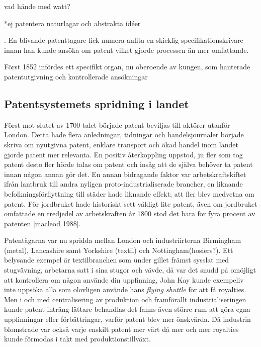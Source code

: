 vad hände med watt?

*ej patentera naturlagar och abstrakta idéer 


. En
blivande patenttagare fick numera anlita en skicklig specifikationskrivare innan han kunde ansöka om
patent vilket gjorde processen än mer omfattande.

Först 1852 infördes ett specifikt organ, nu oberoende av kungen, som hanterade patentutgivning och kontrollerade ansökningar


\subsection{Patentsystemets spridning i landet} %
\label{sub:patentsystemets_spridning_i_landet}

Först mot slutet av 1700-talet började patent beviljas till aktörer utanför London. Detta hade flera
anledningar, tidningar och handelsjournaler började skriva om nyutgivna patent, enklare transport och
ökad handel inom landet gjorde patent mer relevanta. En positiv återkoppling uppstod, ju fler som tog
patent desto fler hörde talas om patent och insåg att de själva behöver ta patent innan någon annan gör
det. En annan bidragande faktor var arbetskraftskiftet ifrån lantbruk till andra nyligen
proto-industrialiserade brancher, en liknande befolkningsförflyttning till städer hade liknande effekt;
att fler blev medvetna om patent. För jordbruket hade historiskt sett väldigt lite patent, även om
jordbruket omfattade en tredjedel av arbetskraften år 1800 stod det bara för fyra procent av patenten
[macleod 1988].

Patentägarna var nu spridda mellan London och industriirterna Birmingham (metal), Lancashire samt
Yorkshire (textil) och Nottingham(hosiers?). Ett belysande exempel är textilbranchen som under gillet
främst sysslat med stugvävning, arbetarna satt i sina stugor och vävde, då var det snudd på omöjligt att
kontrollera om någon använde din uppfinning, John Kay kunde exempeliv inte uppsöka alla som olovligen
använde hans \emph{flying shuttle} för att få royalties. Men i och med centralisering av produktion och
framförallt industrialiseringen kunde patent intrång lättare behandlas det fanns även större rum att göra
egna uppfinningar eller förbättringar, varför patent blev mer önskvärda. Då industrin blomstrade var
också varje enskilt patent mer värt då mer och mer royalties kunde förmodas i takt med
produktionstillväxt.

